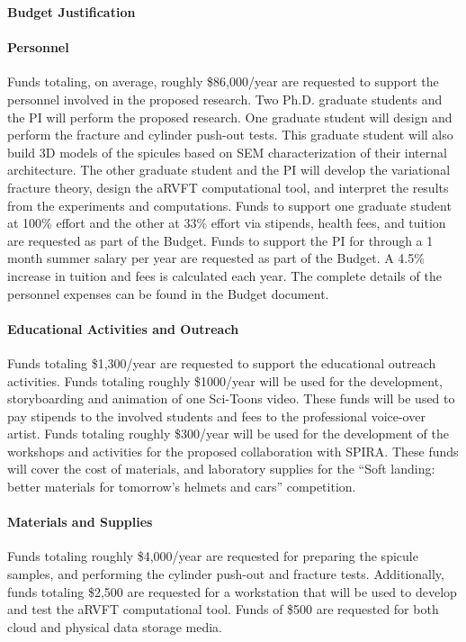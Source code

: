 \documentclass[10pt,letterpaper]{article}
\begin{document}
\begin{center}\textbf{\large{Budget Justification}}\end{center}

\paragraph{Personnel}
Funds totaling, on average, roughly \$86,000/year are requested to support the personnel involved in the proposed research.
Two Ph.D. graduate students and the PI will perform the proposed research. One graduate student will design and perform the fracture and cylinder push-out tests. This graduate student will also build 3D models of the spicules based on SEM characterization of their internal architecture. The other graduate student and the PI will develop the variational fracture theory, design the aRVFT computational tool, and interpret the results from the experiments and computations. Funds to support one graduate student at 100\% effort and the other at 33\% effort via stipends, health fees, and tuition are requested as part of the Budget. Funds to support the PI for through a 1 month summer salary per year are requested as part of the Budget. A 4.5\% increase in tuition and fees is calculated each year. The complete details of the personnel expenses can be found in the Budget document.

\paragraph{Educational Activities and Outreach}
Funds totaling \$1,300/year are requested to support the educational outreach activities. Funds totaling roughly \$1000/year will be used for the development, storyboarding and animation of one Sci-Toons video. These funds will be used to pay stipends to the involved students and fees to the professional voice-over artist. 
Funds totaling roughly \$300/year will be used for the development of the workshops and activities for the proposed collaboration with SPIRA. These funds will cover the cost of materials, and laboratory supplies for the ``Soft landing: better materials for tomorrow's helmets and cars'' competition.

\paragraph{Materials and Supplies}
Funds totaling roughly \$4,000/year are requested for preparing the spicule samples, and performing the cylinder push-out and fracture tests. Additionally, funds totaling \$2,500 are requested for a workstation that will be used to develop and test the aRVFT computational tool. Funds of \$500 are requested for both cloud and physical data storage media.
\end{document}
